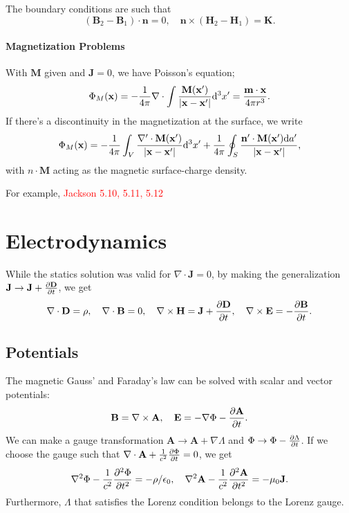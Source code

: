 \documentclass{article}
\begin{document}
The boundary conditions are such that 
$$(\mathbf B_2-\mathbf B_1)\cdot\mathbf n=0,\quad\mathbf n\times(\mathbf H_2-\mathbf H_1)=\mathbf K.$$

\paragraph{Magnetization Problems}
With $\mathbf M$ given and $\mathbf J=0$, we have Poisson's equation;
$$\Phi_M(\mathbf x)=-\frac 1{4\pi}\nabla\cdot\int\frac{\mathbf M(\mathbf x')}{\left\lvert\mathbf x-\mathbf x'\right\rvert}\dd^3x'=\frac{\mathbf m\cdot\mathbf x}{4\pi r^3}.$$
If there's a discontinuity in the magnetization at the surface, we write
$$\Phi_M(\mathbf x)=-\frac 1{4\pi}\int_V\frac{\nabla'\cdot\mathbf M(\mathbf x')}{\left\lvert\mathbf x-\mathbf x'\right\rvert}\dd^3x'+\frac 1{4\pi}\oint_S\frac{\mathbf n'\cdot\mathbf M(\mathbf x')\dd a'}{\left\lvert\mathbf x-\mathbf x'\right\rvert},$$
with $n\cdot\mathbf M$ acting as the magnetic surface-charge density.

For example, \textcolor{red}{Jackson 5.10, 5.11, 5.12}

\section{Electrodynamics}
While the statics solution was valid for $\nabla\cdot\mathbf J=0$, by making the generalization $\mathbf J\to\mathbf J+ \frac{\partial \mathbf D}{\partial t}$, we get 
$$\nabla\cdot\mathbf D=\rho,\quad\nabla\cdot\mathbf B=0,\quad\nabla\times\mathbf H=\mathbf J+ \frac{\partial \mathbf D}{\partial t},\quad\nabla\times\mathbf E=- \frac{\partial \mathbf B}{\partial t}.$$

\subsection{Potentials}
The magnetic Gauss' and Faraday's law can be solved with scalar and vector potentials:
$$\mathbf B=\nabla\times\mathbf A,\quad\mathbf E=-\nabla\Phi- \frac{\partial \mathbf A}{\partial t}.$$
We can make a gauge transformation $\mathbf A\to\mathbf A+\nabla\Lambda$ and $\Phi\to\Phi- \frac{\partial \Lambda}{\partial t}$. If we choose the gauge such that $\nabla\cdot\mathbf A+\frac 1{c^2} \frac{\partial \Phi}{\partial t}=0$, we get 
$$\nabla^2\Phi-\frac 1{c^2}\frac{\partial^{2}\Phi}{\partial{t}^{2}}=-\rho/\epsilon_0,\quad\nabla^2\mathbf A-\frac 1{c^2}\frac{\partial^{2}\mathbf A}{\partial{t}^{2}}=-\mu_0\mathbf J.$$
Furthermore, $\Lambda$ that satisfies the Lorenz condition belongs to the Lorenz gauge. 
\end{document}
